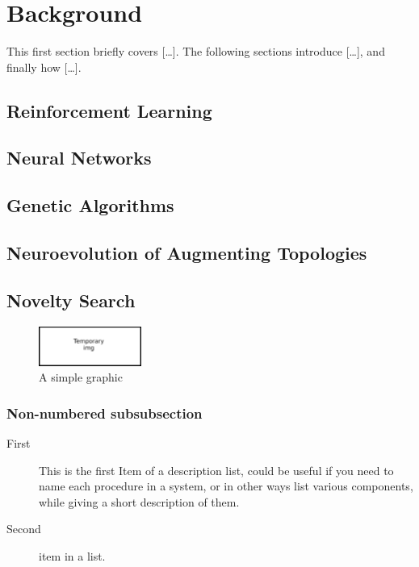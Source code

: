 \section{Background}
\label{sec:background}

This first section briefly covers [\dots]. The following sections introduce [\dots], and finally how [\dots].

\subsection{Reinforcement Learning}
\label{sec:thing1}
\subsection{Neural Networks}
\subsection{Genetic Algorithms}
\subsection{Neuroevolution of Augmenting Topologies}
\subsection{Novelty Search}

\lipsum[1]


\begin{figure}[h]
	\centering
	\includegraphics[width=0.3\textwidth]{resources/temp.png}
	\caption{A simple graphic}
	\label{fig:simple}	
\end{figure}


\subsubsection*{Non-numbered subsubsection}


\begin{description}
	\item [First] This is the first Item of a description list, could be useful if you need to name each procedure in a system, or in other ways list various components, while giving a short description of them.

	\item [Second] item in a list.
	

\end{description}

